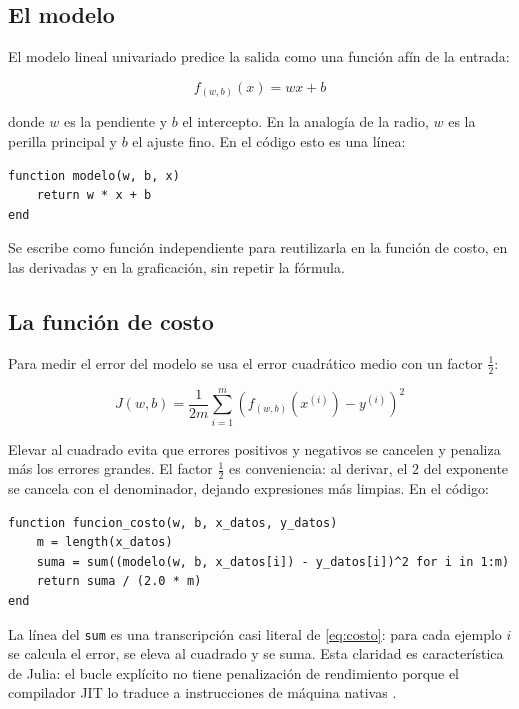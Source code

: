 \documentclass[11pt,a4paper]{article}
\begin{document}
\subsection{El modelo}

El modelo lineal univariado predice la salida como una funci\'on af\'in de la entrada:

\begin{equation}
  f_{(w,b)}(x) = wx + b
  \label{eq:modelo}
\end{equation}

donde $w$ es la pendiente y $b$ el intercepto. En la analog\'ia de la radio, $w$ es la perilla principal y $b$ el ajuste fino. En el c\'odigo esto es una l\'inea:

\begin{lstlisting}
function modelo(w, b, x)
    return w * x + b
end
\end{lstlisting}

Se escribe como funci\'on independiente para reutilizarla en la funci\'on de costo, en las derivadas y en la graficaci\'on, sin repetir la f\'ormula.

\subsection{La funci\'on de costo}

Para medir el error del modelo se usa el error cuadr\'atico medio con un factor $\tfrac{1}{2}$:

\begin{equation}
  J(w,b) = \frac{1}{2m} \sum_{i=1}^{m} \left( f_{(w,b)}\!\left(x^{(i)}\right) - y^{(i)} \right)^2
  \label{eq:costo}
\end{equation}

Elevar al cuadrado evita que errores positivos y negativos se cancelen y penaliza m\'as los errores grandes. El factor $\tfrac{1}{2}$ es conveniencia: al derivar, el $2$ del exponente se cancela con el denominador, dejando expresiones m\'as limpias. En el c\'odigo:

\begin{lstlisting}
function funcion_costo(w, b, x_datos, y_datos)
    m = length(x_datos)
    suma = sum((modelo(w, b, x_datos[i]) - y_datos[i])^2 for i in 1:m)
    return suma / (2.0 * m)
end
\end{lstlisting}

La l\'inea del \texttt{sum} es una transcripci\'on casi literal de \eqref{eq:costo}: para cada ejemplo $i$ se calcula el error, se eleva al cuadrado y se suma. Esta claridad es caracter\'istica de Julia: el bucle expl\'icito no tiene penalizaci\'on de rendimiento porque el compilador JIT lo traduce a instrucciones de m\'aquina nativas \cite{bezanson2017julia}.
\end{document}
